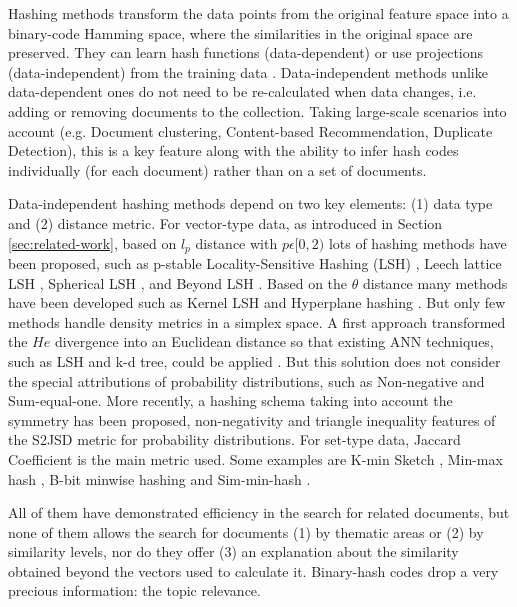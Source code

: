 Hashing methods transform the data points from the original feature space into a binary-code Hamming space, where the similarities in the original space are preserved. They can learn hash functions (data-dependent) or use projections (data-independent) from the training data \citep{Wang2016}. Data-independent methods unlike data-dependent ones do not need to be re-calculated when data changes, i.e. adding or removing documents to the collection. Taking large-scale scenarios into account (e.g. Document clustering, Content-based Recommendation, Duplicate Detection), this is a key feature along with the ability to infer hash codes individually (for each document) rather than on a set of documents. 

Data-independent hashing methods depend on two key elements: (1) data type and (2) distance metric. For vector-type data, as introduced in Section \ref{sec:related-work}, based on $l_p$ distance with $p \epsilon [0,2)$ lots of hashing methods have been proposed, such as p-stable Locality-Sensitive Hashing (LSH) \citep{Datar2004}, Leech lattice LSH \citep{Andoni2006}, Spherical LSH \citep{Terasawa2007}, and Beyond LSH \citep{Andoni2014}. Based on the $\theta$ distance many methods have been developed such as Kernel LSH \citep{Kulis2012} and Hyperplane hashing \citep{Vijayanarasimhan2014}. But only few methods handle density metrics in a simplex space. A first approach transformed the $He$ divergence into an Euclidean distance so that existing ANN techniques, such as LSH and k-d tree, could be applied \citep{Krstovski2013a}. But this solution does not consider the special attributions of probability distributions, such as Non-negative and Sum-equal-one. More recently, a hashing schema \citep{Mao2017} taking into account the symmetry has been proposed, non-negativity and triangle inequality features of the S2JSD metric for probability distributions. For set-type data, Jaccard Coefficient is the main metric used. Some examples are K-min Sketch \citep{Li2012}, Min-max hash \citep{Ji2013}, B-bit minwise hashing \citep{Li2010b} and Sim-min-hash \citep{Zhao2013}.

All of them have demonstrated efficiency in the search for related documents, but none of them allows the search for documents (1) by thematic areas or (2) by similarity levels, nor do they offer (3) an explanation about the similarity obtained beyond the vectors used to calculate it. Binary-hash codes drop a very precious information: the topic relevance.


